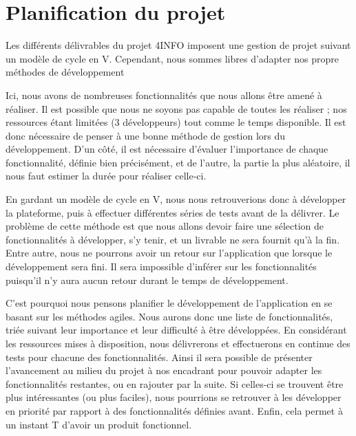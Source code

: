 \section{Planification du projet}
\label{sec:orga}

	Les différents délivrables du projet 4INFO imposent une gestion de projet suivant un modèle de cycle en V. Cependant, nous sommes libres d'adapter nos propre méthodes de développement 

	Ici, nous avons de nombreuses fonctionnalités que nous allons être amené à réaliser. Il est possible que nous ne soyons pas capable de toutes les réaliser ; nos ressources étant limitées (3 développeurs) tout comme le temps disponible. Il est donc nécessaire de penser à une bonne méthode de gestion lors du développement. D'un côté, il est nécessaire d'évaluer l'importance de chaque fonctionnalité, définie bien précisément, et de l'autre, la partie la plus aléatoire, il nous faut estimer la durée pour réaliser celle-ci.

	En gardant un modèle de cycle en V, nous nous retrouverions donc à développer la plateforme, puis à effectuer différentes séries de tests avant de la délivrer. Le problème de cette méthode est que nous allons devoir faire une sélection de fonctionnalités à développer, s'y tenir, et un livrable ne sera fournit qu'à la fin. Entre autre, nous ne pourrons avoir un retour sur l'application que lorsque le développement sera fini. Il sera impossible d'inférer sur les fonctionnalités puisqu'il n'y aura aucun retour durant le temps de développement. 

	C'est pourquoi nous pensons planifier le développement de l'application en se basant sur les méthodes agiles. Nous aurons donc une liste de fonctionnalités, triée suivant leur importance et leur difficulté à être développées. En considérant les ressources mises à disposition, nous délivrerons et effectuerons en continue des tests pour chacune des fonctionnalités. Ainsi il sera possible de présenter l'avancement au milieu du projet à nos encadrant pour pouvoir adapter les fonctionnalités restantes, ou en rajouter par la suite. Si celles-ci se trouvent être plus intéressantes (ou plus faciles), nous pourrions se retrouver à les développer en priorité par rapport à des fonctionnalités définies avant. Enfin, cela permet à un instant T d'avoir un produit fonctionnel.